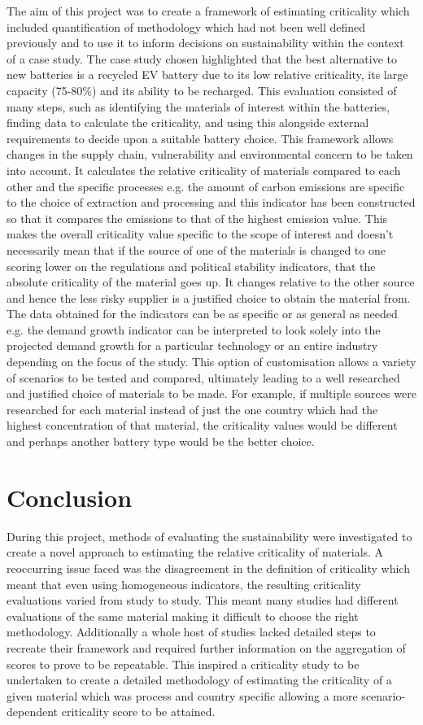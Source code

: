 \documentclass{article}
\begin{document}
The aim of this project was to create a framework of estimating criticality which included quantification of methodology which had not been well defined previously and to use it to inform decisions on sustainability within the context of a case study. The case study chosen highlighted that the best alternative to new batteries is a recycled EV battery due to its low relative criticality, its large capacity (75-80\%) and its ability to be recharged. This evaluation consisted of many steps, such as identifying the materials of interest within the batteries, finding data to calculate the criticality, and using this alongside external requirements to decide upon a suitable battery choice. This framework allows changes in the supply chain, vulnerability and environmental concern to be taken into account. It calculates the relative criticality of materials compared to each other and the specific processes e.g. the amount of carbon emissions are specific to the choice of extraction and processing and this indicator has been constructed so that it compares the emissions to that of the highest emission value. This makes the overall criticality value specific to the scope of interest and doesn't necessarily mean that if the source of one of the materials is changed to one scoring lower on the regulations and political stability indicators, that the absolute criticality of the material goes up. It changes relative to the other source and hence the less risky supplier is a justified choice to obtain the material from. The data obtained for the indicators can be as specific or as general as needed e.g. the demand growth indicator can be interpreted to look solely into the projected demand growth for a particular technology or an entire industry depending on the focus of the study. This option of customisation allows a variety of scenarios to be tested and compared, ultimately leading to a well researched and justified choice of materials to be made. For example, if multiple sources were researched for each material instead of just the one country which had the highest concentration of that material, the criticality values would be different and perhaps another battery type would be the better choice.

\section{Conclusion}
During this project, methods of evaluating the sustainability were investigated to create a novel approach to estimating the relative criticality of materials. A reoccurring issue faced was the disagreement in the definition of criticality which meant that even using homogeneous indicators, the resulting criticality evaluations varied from study to study. This meant many studies had different evaluations of the same material making it difficult to choose the right methodology. Additionally a whole host of studies lacked detailed steps to recreate their framework and required further information on the aggregation of scores to prove to be repeatable. This inspired a criticality study to be undertaken to create a detailed methodology of estimating the criticality of a given material which was process and country specific allowing a more scenario-dependent criticality score to be attained.
\end{document}
